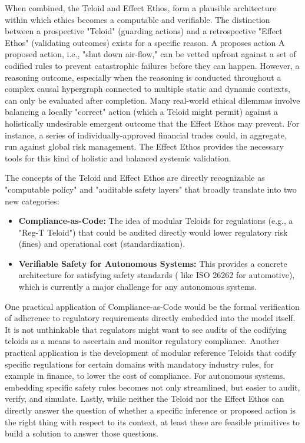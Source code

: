 \documentclass{article}
\begin{document}
When combined, the Teloid and Effect Ethos, form a plausible architecture within which ethics becomes a computable and
verifiable. The distinction between a prospective "Teloid" (guarding actions) and a retrospective "Effect Ethos"
(validating outcomes) exists for a specific reason. A proposes action A proposed action, i.e., "shut down air-flow,"
can be vetted upfront against a set of codified rules to prevent catastrophic failures before they can happen.
However, a reasoning outcome, especially when the reasoning is conducted throughout a complex causal hypergraph
connected to multiple static and dynamic contexts, can only be evaluated after completion.
Many real-world ethical dilemmas involve balancing a locally "correct" action (which a Teloid might permit) against a
holistically undesirable emergent outcome that the Effect Ethos may prevent. For instance, a series of
individually-approved financial trades could, in aggregate, run against global risk management.
The Effect Ethos provides the necessary tools for this kind of holistic and balanced systemic validation.

The concepts of the Teloid and Effect Ethos are directly recognizable as "computable policy" and "auditable safety
layers" that broadly translate into two new categories:

\begin{itemize}
  \item \textbf{Compliance-as-Code:} The idea of modular Teloids for regulations (e.g., a "Reg-T Teloid") that could be audited
  directly would lower regulatory risk (fines) and operational cost (standardization).
  \item \textbf{Verifiable Safety for Autonomous Systems:} This provides a concrete architecture for satisfying safety standards (
  like ISO 26262 for automotive), which is currently a major challenge for any autonomous systems.
\end{itemize}


One practical application of Compliance-as-Code would be the formal verification of adherence to regulatory requirements
directly embedded into the model itself. It is not unthinkable that regulators might want to see audits of the codifying
teloids as a means to ascertain and monitor regulatory compliance. Another practical application is the development of
modular reference Teloids that codify specific regulations for certain domains with mandatory industry rules,
for example in finance, to lower the cost of compliance. For autonomous systems, embedding specific safety rules
becomes not only streamlined, but easier to audit, verify, and simulate. Lastly, while neither the Teloid nor the Effect
Ethos can directly answer the question of whether a specific inference or proposed action is the right thing
with respect to its context, at least these are feasible primitives to build a solution to answer those questions.
\end{document}
